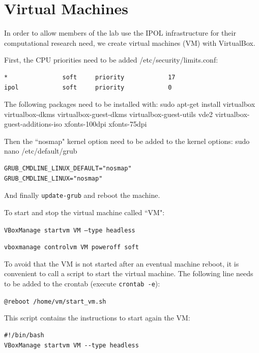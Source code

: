 \documentclass[a4paper,12pt]{article}
\begin{document}

\section{Virtual Machines}
In order to allow members of the lab use the IPOL infrastructure for their computational research need, we create virtual machines (VM) with VirtualBox.

First, the CPU priorities need to be added /etc/security/limits.conf:
\begin{verbatim}
*               soft     priority            17
ipol            soft     priority            0
\end{verbatim}


The following packages need to be installed with: sudo apt-get install virtualbox virtualbox-dkms virtualbox-guest-dkms virtualbox-guest-utils vde2 virtualbox-guest-additions-iso xfonts-100dpi xfonts-75dpi

Then the ``nosmap" kernel option need to be added to the kernel options: sudo nano /etc/default/grub

\begin{verbatim}
GRUB_CMDLINE_LINUX_DEFAULT="nosmap"
GRUB_CMDLINE_LINUX="nosmap"
\end{verbatim}

And finally {\tt update-grub} and reboot the machine.

To start and stop the virtual machine called ``VM":

{\tt VBoxManage startvm VM --type headless}

{\tt vboxmanage controlvm VM poweroff soft}

To avoid that the VM is not started after an eventual machine reboot, it is convenient to call a script to start the virtual machine. The following line needs to be added to the crontab (execute {\tt crontab -e}):

{\tt @reboot /home/vm/start\_vm.sh}

This script contains the instructions to start again the VM:

\begin{verbatim}
#!/bin/bash
VBoxManage startvm VM --type headless
\end{verbatim}




\end{document}
